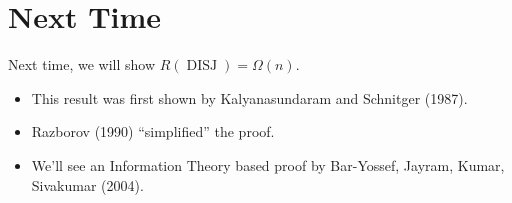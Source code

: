 \documentclass[twoside]{article}
\newcommand\disj{\operatorname{DISJ}}
\begin{document}
\section{Next Time}
Next time, we will show $R(\disj) = \Omega(n)$.
\begin{itemize}
\item This result was first shown by Kalyanasundaram and Schnitger (1987).
\item Razborov (1990) ``simplified'' the proof.
\item We'll see an Information Theory based proof by Bar-Yossef, Jayram,
Kumar, Sivakumar (2004).
\end{itemize}
\end{document}
